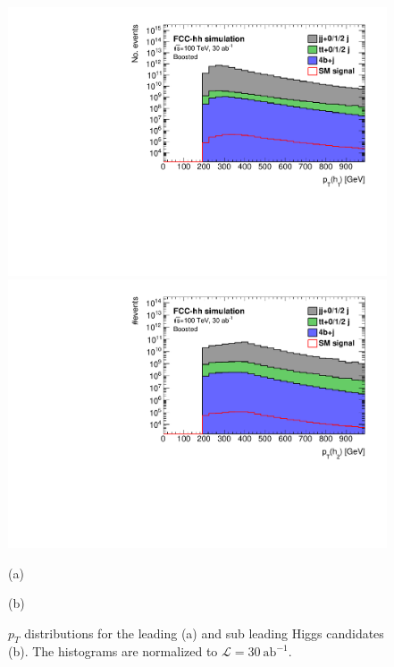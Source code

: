 \begin{figure}
	\centering
	\begin{minipage}{.5\textwidth}
		\centering
		\includegraphics[trim={.65cm 0 0 0},clip,width=\linewidth]{./Figures/hist_h1_pt_stack.pdf}
	\end{minipage}%
	\begin{minipage}{.5\textwidth}
		\centering
		\includegraphics[trim={0 0 .65cm 0},clip,width=\linewidth]{./Figures/hist_h2_pt_stack.pdf}
	\end{minipage}
	\begin{minipage}[t]{0.5\textwidth}
		\caption*{(a)}
	\end{minipage}%
	\hfill
	\begin{minipage}[t]{0.5\textwidth}
		\caption*{(b)}
	\end{minipage}
	\caption{$p_T$ distributions for the leading (a) and sub leading Higgs candidates (b). The histograms are normalized to $\mathcal{L}=30~\text{ab}^{-1}$.}
	\label{fig:pt_stack}
\end{figure} 

